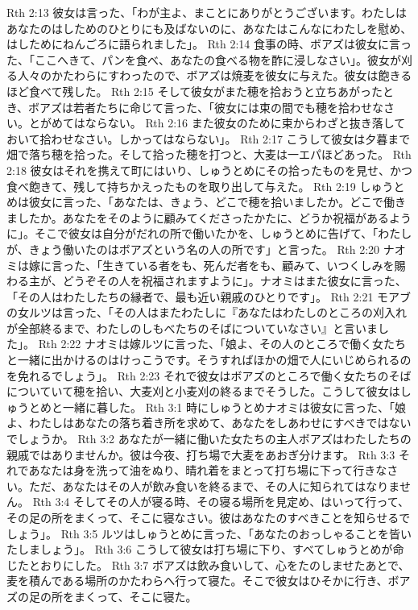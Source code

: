 Rth 2:13  彼女は言った、「わが主よ、まことにありがとうございます。わたしはあなたのはしためのひとりにも及ばないのに、あなたはこんなにわたしを慰め、はしためにねんごろに語られました」。
Rth 2:14  食事の時、ボアズは彼女に言った、「ここへきて、パンを食べ、あなたの食べる物を酢に浸しなさい」。彼女が刈る人々のかたわらにすわったので、ボアズは焼麦を彼女に与えた。彼女は飽きるほど食べて残した。
Rth 2:15  そして彼女がまた穂を拾おうと立ちあがったとき、ボアズは若者たちに命じて言った、「彼女には束の間でも穂を拾わせなさい。とがめてはならない。
Rth 2:16  また彼女のために束からわざと抜き落しておいて拾わせなさい。しかってはならない」。
Rth 2:17  こうして彼女は夕暮まで畑で落ち穂を拾った。そして拾った穂を打つと、大麦は一エパほどあった。
Rth 2:18  彼女はそれを携えて町にはいり、しゅうとめにその拾ったものを見せ、かつ食べ飽きて、残して持ちかえったものを取り出して与えた。
Rth 2:19  しゅうとめは彼女に言った、「あなたは、きょう、どこで穂を拾いましたか。どこで働きましたか。あなたをそのように顧みてくださったかたに、どうか祝福があるように」。そこで彼女は自分がだれの所で働いたかを、しゅうとめに告げて、「わたしが、きょう働いたのはボアズという名の人の所です」と言った。
Rth 2:20  ナオミは嫁に言った、「生きている者をも、死んだ者をも、顧みて、いつくしみを賜わる主が、どうぞその人を祝福されますように」。ナオミはまた彼女に言った、「その人はわたしたちの縁者で、最も近い親戚のひとりです」。
Rth 2:21  モアブの女ルツは言った、「その人はまたわたしに『あなたはわたしのところの刈入れが全部終るまで、わたしのしもべたちのそばについていなさい』と言いました」。
Rth 2:22  ナオミは嫁ルツに言った、「娘よ、その人のところで働く女たちと一緒に出かけるのはけっこうです。そうすればほかの畑で人にいじめられるのを免れるでしょう」。
Rth 2:23  それで彼女はボアズのところで働く女たちのそばについていて穂を拾い、大麦刈と小麦刈の終るまでそうした。こうして彼女はしゅうとめと一緒に暮した。
Rth 3:1  時にしゅうとめナオミは彼女に言った、「娘よ、わたしはあなたの落ち着き所を求めて、あなたをしあわせにすべきではないでしょうか。
Rth 3:2  あなたが一緒に働いた女たちの主人ボアズはわたしたちの親戚ではありませんか。彼は今夜、打ち場で大麦をあおぎ分けます。
Rth 3:3  それであなたは身を洗って油をぬり、晴れ着をまとって打ち場に下って行きなさい。ただ、あなたはその人が飲み食いを終るまで、その人に知られてはなりません。
Rth 3:4  そしてその人が寝る時、その寝る場所を見定め、はいって行って、その足の所をまくって、そこに寝なさい。彼はあなたのすべきことを知らせるでしょう」。
Rth 3:5  ルツはしゅうとめに言った、「あなたのおっしゃることを皆いたしましょう」。
Rth 3:6  こうして彼女は打ち場に下り、すべてしゅうとめが命じたとおりにした。
Rth 3:7  ボアズは飲み食いして、心をたのしませたあとで、麦を積んである場所のかたわらへ行って寝た。そこで彼女はひそかに行き、ボアズの足の所をまくって、そこに寝た。
